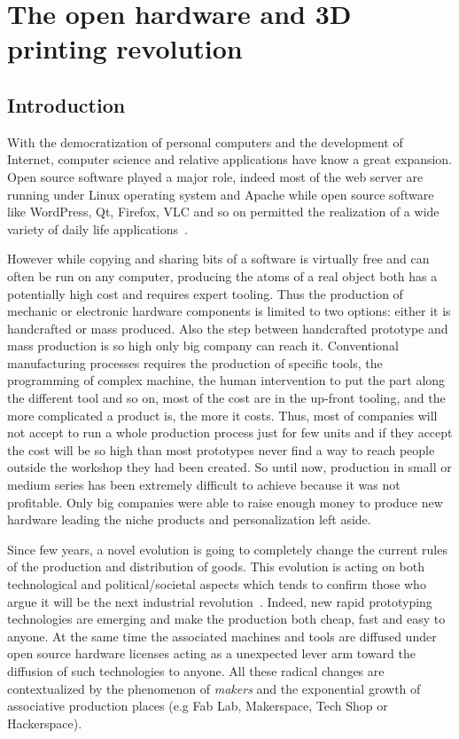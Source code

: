 
\cleartoleftpage


\chapter{The open hardware and 3D printing revolution}



\section{Introduction} %

With the democratization of personal computers and the development of Internet, computer science and relative applications have know a great expansion. Open source software played a major role, indeed most of the web server are running under Linux operating system and Apache while open source software like WordPress, Qt, Firefox, VLC and so on permitted the realization of a wide variety of daily life applications~\cite{peeling2001analysis}.

However while copying and sharing bits of a software is virtually free and can often be run on any computer, producing the atoms of a real object both has a potentially high cost and requires expert tooling. Thus the production of mechanic or electronic hardware components is limited to two options: either it is handcrafted or mass produced. Also the step between handcrafted prototype and mass production is so high only big company can reach it. Conventional manufacturing processes requires the production of specific tools, the programming of complex machine, the human intervention to put the part along the different tool and so on, most of the cost are in the up-front tooling, and the more complicated a product is, the more it costs. Thus, most of companies will not accept to run a whole production process just for few units and if they accept the cost will be so high than most prototypes never find a way to reach people outside the workshop they had been created. So until now, production in small or medium series has been extremely difficult to achieve because it was not profitable.
Only big companies were able to raise enough money to produce new hardware leading the niche products and personalization left aside.

Since few years, a novel evolution is going to completely change the current rules of the production and distribution of goods. This evolution is acting on both technological and political/societal aspects which tends to confirm those who argue it will be the next industrial revolution~\cite{anderson}. Indeed, new rapid prototyping technologies are emerging and make the production both cheap, fast and easy to anyone. At the same time the associated machines and tools are diffused under open source hardware licenses acting as a unexpected lever arm toward the diffusion of such technologies to anyone. All these radical changes are contextualized by the phenomenon of \emph{makers} and the exponential growth of associative production places (e.g Fab Lab, Makerspace, Tech Shop or Hackerspace).

